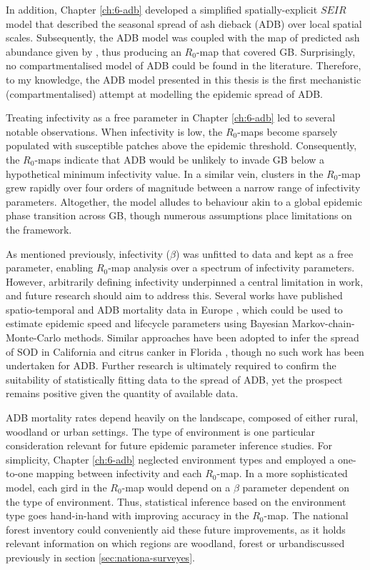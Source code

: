 In addition, Chapter \ref{ch:6-adb} developed a simplified spatially-explicit $SEIR$ model that described the seasonal spread of ash dieback (ADB) over local spatial scales.
Subsequently, the ADB model was coupled with the map of predicted ash abundance given by \cite{hill.data}, thus producing an $R_0$-map that covered GB.  
Surprisingly, no compartmentalised model of ADB could be found in the literature. Therefore, to my knowledge, the ADB model presented in this thesis 
is the first mechanistic (compartmentalised) attempt at modelling the epidemic spread of ADB.

Treating infectivity as a free parameter in Chapter \ref{ch:6-adb} led to several notable observations. When infectivity is low, the $R_0$-maps become sparsely populated with susceptible patches above the epidemic threshold. Consequently, the $R_0$-maps indicate that ADB would be unlikely to invade GB below a hypothetical minimum infectivity value.
In a similar vein, clusters in the $R_0$-map grew rapidly over four orders of magnitude between a narrow range of infectivity parameters.
Altogether, the model alludes to behaviour akin to a global epidemic phase transition across GB, though numerous assumptions place limitations on the framework.

As mentioned previously, infectivity ($\beta$) was unfitted to data and kept as a free parameter, enabling $R_0$-map analysis over a spectrum of infectivity parameters. 
However, arbitrarily defining infectivity underpinned a central limitation in work, and future research should aim to address this. 
Several works have published spatio-temporal and ADB mortality data in Europe \cite{https://doi.org/10.1111/1365-2745.13383, https://doi.org/10.1002/ppp3.11, stocks2017first, lohmus2014ash}, which could be used to estimate epidemic speed and lifecycle parameters using Bayesian Markov-chain-Monte-Carlo methods.
Similar approaches have been adopted to infer the spread of SOD in California \cite{10.1371/journal.pcbi.1002328} and citrus canker in Florida \cite{neri2014bayesian}, though no such work has been undertaken for ADB.
Further research is ultimately required to confirm the suitability of statistically fitting data to the spread of ADB, yet the prospect remains positive given the quantity of available data.

ADB mortality rates depend heavily on the landscape, composed of either rural, woodland or urban settings.
The type of environment is one particular consideration relevant for future epidemic parameter inference studies.
For simplicity, Chapter \ref{ch:6-adb} neglected environment types and employed a one-to-one mapping between infectivity and each $R_0$-map. In a more sophisticated model, each gird in the $R_0$-map would depend on a $\beta$ parameter dependent on the type of environment.
Thus, statistical inference based on the environment type goes hand-in-hand with improving accuracy in the $R_0$-map.
The national forest inventory could conveniently aid these future improvements, as it holds relevant information on which regions are woodland, forest or urban\textemdash discussed previously in section \ref{sec:nationa-surveyes}.

